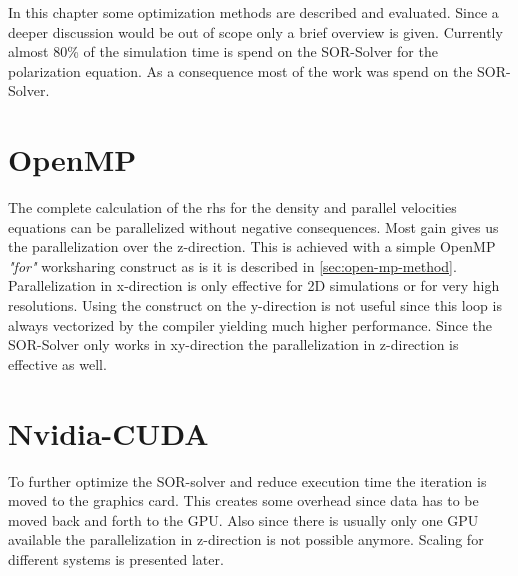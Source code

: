 In this chapter some optimization methods are described and evaluated. Since a deeper discussion would be out of scope only a brief overview is given. Currently almost 80\% of the simulation time is spend on the SOR-Solver for the polarization equation. As a consequence most of the work was spend on the SOR-Solver.
\section{OpenMP}
The complete calculation of the \ac{rhs} for the density and parallel velocities equations can be parallelized without negative consequences. Most gain gives us the parallelization over the z-direction. This is achieved with a simple OpenMP \textit{"for"} worksharing construct as is it is described in \autoref{sec:open-mp-method}. Parallelization in x-direction is only effective for 2D simulations or for very high resolutions. Using the construct on the y-direction is not useful since this loop is always vectorized by the compiler yielding much higher performance. Since the SOR-Solver only works in xy-direction the parallelization in z-direction is effective as well.

\section{Nvidia-CUDA}
To further optimize the SOR-solver and reduce execution time the iteration is moved to the graphics card. This creates some overhead since data has to be moved back and forth to the GPU. Also since there is usually only one GPU available the parallelization in z-direction is not possible anymore. Scaling for different systems is presented later.


